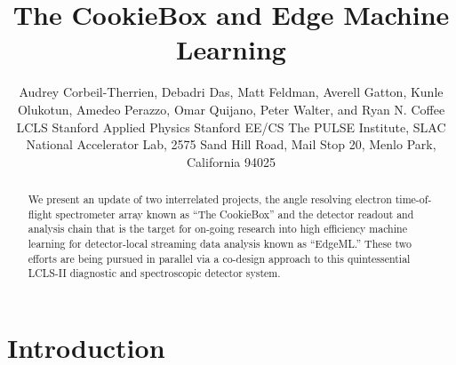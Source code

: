 \documentclass[aps]{revtex4}
\begin{document}

\title{The CookieBox and Edge Machine Learning}

\author{Audrey Corbeil-Therrien\footnotemark, Debadri Das\footnotemark, Matt Feldman\footnotemark, \setcounter{footnote}{0} Averell Gatton\footnotemark, Kunle Olukotun\setcounter{footnote}{2}\footnotemark, Amedeo Perazzo\setcounter{footnote}{0}\footnotemark, Omar Quijano\setcounter{footnote}{0}\footnotemark, Peter Walter\setcounter{footnote}{0}\footnotemark, and Ryan N. Coffee\setcounter{footnote}{0}\footnotemark \setcounter{footnote}{3}\footnotemark\\
\setcounter{footnote}{0}\footnotemark LCLS \hspace{24pt} \footnotemark Stanford Applied Physics \hspace{24pt} \footnotemark Stanford EE/CS \hspace{24pt}\footnotemark The PULSE Institute, SLAC National Accelerator Lab, 2575 Sand Hill Road, Mail Stop 20, Menlo Park, California 94025}

\setlength{\parindent}{.05\linewidth}




\newlength{\figwidth}
\setlength{\figwidth}{.9\linewidth}


\begin{abstract}
We present an update of two interrelated projects, the angle resolving electron time-of-flight spectrometer array known as ``The CookieBox'' and the detector readout and analysis chain that is the target for on-going research into high efficiency machine learning for detector-local streaming data analysis known as ``EdgeML.''
These two efforts are being pursued in parallel via a co-design approach to this quintessential LCLS-II diagnostic and spectroscopic detector system.
\end{abstract}



\section{Introduction}
\end{document}

